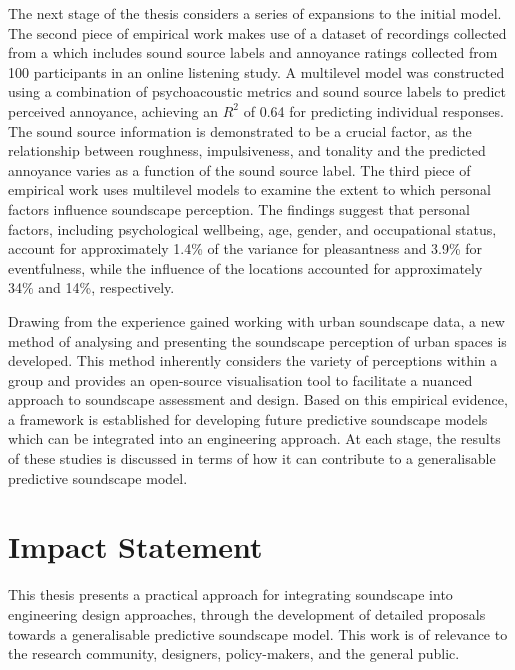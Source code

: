 \documentclass[oneside,fontsize=11pt,titlepage,chapterprefix=true
]{scrbook}
\begin{document}
The next stage of the thesis considers a series of expansions to the initial model. The second piece of empirical work makes use of a dataset of recordings collected from a  which includes sound source labels and annoyance ratings collected from 100 participants in an online listening study. A multilevel model was constructed using a combination of psychoacoustic metrics and sound source labels to predict perceived annoyance, achieving an $R^2$ of 0.64 for predicting individual responses. The sound source information is demonstrated to be a crucial factor, as the relationship between roughness, impulsiveness, and tonality and the predicted annoyance varies as a function of the sound source label. The third piece of empirical work uses multilevel models to examine the extent to which personal factors influence soundscape perception. The findings suggest that personal factors, including psychological wellbeing, age, gender, and occupational status, account for approximately 1.4\% of the variance for pleasantness and 3.9\% for eventfulness, while the influence of the locations accounted for approximately 34\% and 14\%, respectively. 

Drawing from the experience gained working with urban soundscape data, a new method of analysing and presenting the soundscape perception of urban spaces is developed. This method inherently considers the variety of perceptions within a group and provides an open-source visualisation tool to facilitate a nuanced approach to soundscape assessment and design. Based on this empirical evidence, a framework is established for developing future predictive soundscape models which can be integrated into an engineering approach. At each stage, the results of these studies is discussed in terms of how it can contribute to a generalisable predictive soundscape model. 


\chapter*{Impact Statement}
This thesis presents a practical approach for integrating soundscape into engineering design approaches, through the development of detailed proposals towards a generalisable predictive soundscape model. This work is of relevance to the research community, designers, policy-makers, and the general public. 
\end{document}
